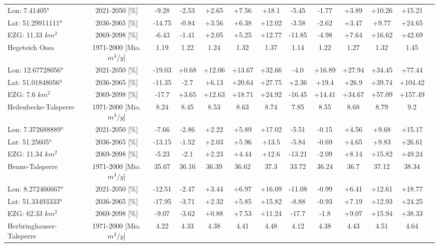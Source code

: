\begin{longtable}{@{\extracolsep{\fill}}lc|ccccc||cccccc}
Lon: 7.41405° & 2021-2050 [\%]  & -9.28 & -2.53 & +2.65 & +7.56 & +18.1 & -5.45 & -1.77 & +3.89 & +10.26 & +15.21 & \\ 
Lat: 51.29911111° & 2036-2065 [\%]  & -14.75 & -0.84 & +3.56 & +6.38 & +12.02 & -3.58 & -2.62 & +3.47 & +9.77 & +24.65 & \\ 
EZG: 11.33 $km^2$ & 2069-2098 [\%]  & -6.43 & -1.41 & +2.05 & +5.25 & +12.77 & -11.85 & -4.98 & +7.64 & +16.62 & +42.69 & \\ 
\hline 
Hegeteich Ossa & 1971-2000 [Mio. $m^3/y$]  & 1.19 & 1.22 & 1.24 & 1.32 & 1.37 & 1.14 & 1.22 & 1.27 & 1.32 & 1.45 & \\ 
\cline{2-13} 
Lon: 12.67728056° & 2021-2050 [\%]  & -19.03 & +0.68 & +12.06 & +13.67 & +32.66 & -4.0 & +16.89 & +27.94 & +34.45 & +77.44 & \\ 
Lat: 51.01848056° & 2036-2065 [\%]  & -11.35 & -2.7 & +6.13 & +20.64 & +27.75 & +2.36 & +19.4 & +26.9 & +39.74 & +104.42 & \\ 
EZG: 7.6 $km^2$ & 2069-2098 [\%]  & -17.7 & +3.65 & +12.63 & +18.71 & +24.92 & -16.45 & +14.41 & +34.67 & +57.09 & +157.49 & \\ 
\hline 
Heilenbecke-Talsperre & 1971-2000 [Mio. $m^3/y$]  & 8.24 & 8.45 & 8.53 & 8.63 & 8.74 & 7.85 & 8.55 & 8.68 & 8.79 & 9.2 & \\ 
\cline{2-13} 
Lon: 7.372688889° & 2021-2050 [\%]  & -7.66 & -2.86 & +2.22 & +5.89 & +17.02 & -5.51 & -0.15 & +4.56 & +9.68 & +15.17 & \\ 
Lat: 51.25605° & 2036-2065 [\%]  & -13.15 & -1.52 & +2.03 & +5.96 & +13.5 & -5.84 & -0.69 & +4.65 & +9.83 & +26.61 & \\ 
EZG: 11.34 $km^2$ & 2069-2098 [\%]  & -5.23 & -2.1 & +2.23 & +4.44 & +12.6 & -13.21 & -2.09 & +8.14 & +15.82 & +49.24 & \\ 
\hline 
Henne-Talsperre & 1971-2000 [Mio. $m^3/y$]  & 35.67 & 36.16 & 36.39 & 36.62 & 37.3 & 33.72 & 36.24 & 36.7 & 37.12 & 38.34 & \\ 
\cline{2-13} 
Lon: 8.272466667° & 2021-2050 [\%]  & -12.51 & -2.47 & +3.44 & +6.97 & +16.09 & -11.08 & -0.99 & +6.41 & +12.61 & +18.77 & \\ 
Lat: 51.33493333° & 2036-2065 [\%]  & -17.95 & -3.71 & +2.32 & +5.85 & +15.82 & -8.88 & -0.93 & +7.19 & +12.93 & +24.25 & \\ 
EZG: 62.33 $km^2$ & 2069-2098 [\%]  & -9.07 & -3.62 & +0.88 & +7.53 & +11.24 & -17.7 & -1.8 & +9.07 & +15.94 & +38.33 & \\ 
\hline 
Herbringhauser-Talsperre & 1971-2000 [Mio. $m^3/y$]  & 4.22 & 4.33 & 4.38 & 4.41 & 4.48 & 4.12 & 4.38 & 4.43 & 4.51 & 4.64 & \\ 

\end{longtable}
